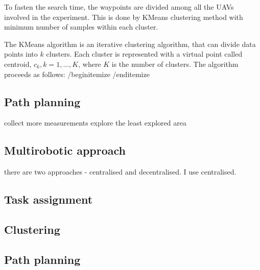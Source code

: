 To fasten the search time, the waypoints are divided among all the \ac{UAV}s involved in the experiment.
This is done by KMeans clustering method with minimum number of samples within each cluster.

The KMeans algorithm is an iterative clustering algorithm, that can divide data points into $k$ clusters.
Each cluster is represented with a virtual point called centroid, $c_{k}, k = 1, ... , K$, where $K$ is the number of clusters.
The algorithm proceeds as follows:
/begin{itemize}
/end{itemize}




\subsection{Path planning}





collect more measurements
explore the least explored area

\subsection{Multirobotic approach}
there are two approaches - centralised and decentralised.
I use centralised.

\subsection{Task assignment}

\subsection{Clustering}
\subsection{Path planning}











